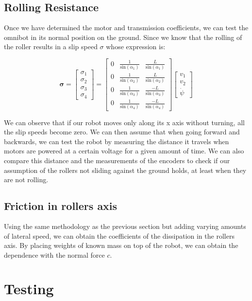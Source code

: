 \documentclass[twoside,onecolumn]{article}
\let\oldsection\section
\renewcommand\section{\Needspace{16\baselineskip}\oldsection}
\let\oldsubsection\subsection
\renewcommand\subsection{\Needspace{13\baselineskip}\oldsubsection}
\renewcommand{\vec}[1]{\bm{#1}}
\newcommand{\mat}[2][b]{\begin{#1matrix}#2\end{#1matrix}}
\begin{document}
\subsection{Rolling Resistance}

Once we have determined the motor and transmission coefficients, we can test the omnibot in its normal position on the ground. Since we know that the rolling of the roller results in a slip speed $\sigma$ whose expression is:

$$\vec{\sigma} = \mat{\sigma_1\\\sigma_2\\\sigma_3\\\sigma_4} = 
\mat{
		0 & \frac{1}{\text{sin}(\alpha_1)} & \frac{L}{\text{sin}(\alpha_1)}\\
		0 & \frac{1}{\text{sin}(\alpha_2)} & \frac{L}{\text{sin}(\alpha_2)}\\
		0 & \frac{1}{\text{sin}(\alpha_3)} & \frac{-L}{\text{sin}(\alpha_3)}\\
		0 & \frac{1}{\text{sin}(\alpha_4)} & \frac{-L}{\text{sin}(\alpha_4)}
}\mat{v_1\\v_2\\\dot{\psi}} $$

We can observe that if our robot moves only along its x axis without turning, all the slip speeds become zero. We can then assume that when going forward and backwards, we can test the robot by measuring the distance it travels when motors are powered at a certain voltage for a given amount of time. We can also compare this distance and the measurements of the encoders to check if our assumption of the rollers not sliding against the ground holds, at least when they are not rolling.

\subsection{Friction in rollers axis}

Using the same methodology as the previous section but adding varying amounts of lateral speed, we can obtain the coefficients of the dissipation in the rollers axis. By placing weights of known mass on top of the robot, we can obtain the dependence with the normal force $c$.

\section{Testing}
\end{document}

